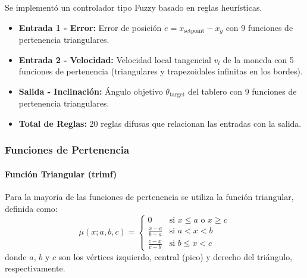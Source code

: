 \documentclass[
A4paper,            1 paper size A4
oneside,            %
openright,          %
10pt,               %
headings=normal,    %
titlepage=on        %
]{article}
\begin{document}
Se implementó un controlador tipo Fuzzy basado en reglas heurísticas.

\begin{itemize}
    \item \textbf{Entrada 1 - Error:} Error de posición $e = x_{\text{setpoint}} - x_g$ con 9 funciones de pertenencia triangulares.
    \item \textbf{Entrada 2 - Velocidad:} Velocidad local tangencial $v_l$ de la moneda con 5 funciones de pertenencia (triangulares y trapezoidales infinitas en los bordes).
    \item \textbf{Salida - Inclinación:} Ángulo objetivo $\theta_{\text{target}}$ del tablero con 9 funciones de pertenencia triangulares.
    \item \textbf{Total de Reglas:} 20 reglas difusas que relacionan las entradas con la salida.
\end{itemize}

\subsubsection{Funciones de Pertenencia}

\paragraph{Función Triangular (trimf)}
Para la mayoría de las funciones de pertenencia se utiliza la función triangular, definida como:
\begin{equation}
    \mu(x; a, b, c) = \begin{cases}
        0 & \text{si } x \leq a \text{ o } x \geq c \\
        \frac{x-a}{b-a} & \text{si } a < x < b \\
        \frac{c-x}{c-b} & \text{si } b \leq x < c
    \end{cases}
\end{equation}
donde $a$, $b$ y $c$ son los vértices izquierdo, central (pico) y derecho del triángulo, respectivamente.
\end{document}
